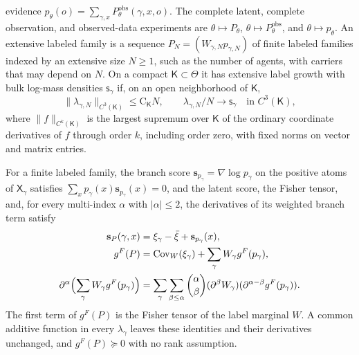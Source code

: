 evidence $p_\theta(o)=\sum_{\gamma,x}P^{\mathrm{obs}}_\theta(\gamma,x,o)$. The complete latent,
complete observation, and observed-data experiments are $\theta\mapsto P_\theta$,
$\theta\mapsto P^{\mathrm{obs}}_\theta$, and $\theta\mapsto p_\theta$. An extensive labeled family
is a sequence $P_N=(W_{\gamma,N}p_{\gamma,N})$ of finite labeled families indexed by an extensive
size $N\geq1$, such as the number of agents, with carriers that may depend on $N$. On a compact
$\mathsf K\subset\Theta$ it has extensive label growth with bulk log-mass densities
$\mathsf s_\gamma$ if, on an open neighborhood of $\mathsf K$,
\begin{equation}
\|\lambda_{\gamma,N}\|_{C^3(\mathsf K)}\leq\mathrm C_{\mathsf K}N,
\qquad
\lambda_{\gamma,N}/N\longrightarrow\mathsf s_\gamma\quad\text{in }C^3(\mathsf K),
\label{eq:rg-thermo-label-effective-growth}
\end{equation}
where $\|f\|_{C^k(\mathsf K)}$ is the largest supremum over $\mathsf K$ of the ordinary coordinate
derivatives of $f$ through order $k$, including order zero, with fixed norms on vector and matrix
entries.

\label{eq:rg-thermo-finite-branch-score}
For a finite labeled family, the branch score $\mathbf s_{p_\gamma}=\nabla\log p_\gamma$ on the
positive atoms of $\mathsf X_\gamma$ satisfies $\sum_{x}p_\gamma(x)\mathbf s_{p_\gamma}(x)=0$, and
the latent score, the Fisher tensor, and, for every multi-index $\alpha$ with
$\lvert\alpha\rvert\leq2$, the derivatives of its weighted branch term satisfy
\begin{align}
\mathbf s_P(\gamma,x)&=\xi_\gamma-\bar\xi+\mathbf s_{p_\gamma}(x),
\label{eq:rg-thermo-finite-complete-score}\\
g^F(P)&=\operatorname{Cov}_W(\xi_\gamma)+\sum_\gamma W_\gamma g^F(p_\gamma),
\label{eq:rg-thermo-finite-labeled-fisher}\\
\partial^\alpha\Bigl(\sum_\gamma W_\gamma g^F(p_\gamma)\Bigr)
&=\sum_\gamma\sum_{\beta\leq\alpha}\binom{\alpha}{\beta}
(\partial^\beta W_\gamma)(\partial^{\alpha-\beta}g^F(p_\gamma)).
\label{eq:rg-thermo-finite-weighted-fisher-derivatives}
\end{align}
The first term of $g^F(P)$ is the Fisher tensor of the label marginal $W$. A common additive
function in every $\lambda_\gamma$ leaves these identities and their derivatives unchanged, and
$g^F(P)\succeq0$ with no rank assumption. 

